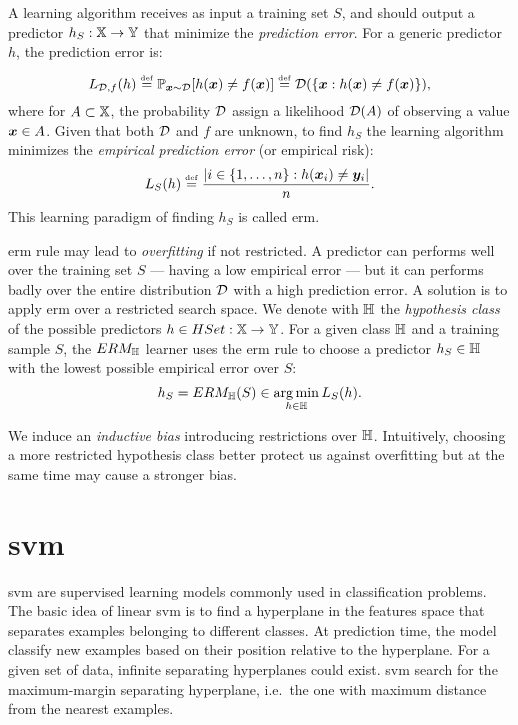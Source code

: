A learning algorithm receives as input a training set $S$, and should
output a predictor $h_S:\mathbb{X}\rightarrow\mathbb{Y}$ that minimize the
\emph{prediction error}. For a generic predictor $h$, the prediction
error is:
\begin{equation}\label{predictionError}
  L_{\mathcal{D},f}(h)\overset{\underset{\mathrm{def}}{}}{=}\mathbb{P}_{\bm{x}\sim\mathcal{D}}[h(\bm{x})\neq
  f(\bm{x})]\overset{\underset{\mathrm{def}}{}}{=}\mathcal{D}(\{\bm{x}:h(\bm{x})\neq
  f(\bm{x})\}),
\end{equation}
where for $A\subset\mathbb{X}$, the probability $\mathcal{D}$ assign a
likelihood $\mathcal{D}(A)$ of observing a value $\bm{x}\in A$. Given
that both $\mathcal{D}$ and $f$ are unknown, to find $h_S$ the learning
algorithm minimizes the \emph{empirical prediction error} (or
empirical risk):
\begin{equation}\label{empiricalError}
  L_S(h)\overset{\underset{\mathrm{def}}{}}{=}\frac{|i\in\{1,\dots,n\}:h(\bm{x}_i)\neq\bm{y}_i|}{n}.
\end{equation}
This learning paradigm of finding $h_S$ is called \ac{erm}.

\ac{erm} rule may lead to \emph{overfitting} if not restricted. A predictor
can performs well over the training set $S$ --- having a low empirical
error --- but it can performs badly over the entire distribution
$\mathcal{D}$ with a high prediction error. A solution is to apply
\ac{erm} over a restricted search space. We denote with $\mathbb{H}$ the
\emph{hypothesis class} of the possible predictors
$h\in{HSet}:\mathbb{X}\rightarrow\mathbb{Y}$. For a given class $\mathbb{H}$ and a
training sample $S$, the $ERM_{\mathbb{H}}$ learner uses the \ac{erm} rule to
choose a predictor $h_S\in\mathbb{H}$ with the lowest possible empirical
error over $S$:
\begin{equation*}
  h_S=ERM_{\mathbb{H}}(S)\in \operatorname*{arg\,min}_{h\in\mathbb{H}} L_S(h).
\end{equation*}

We induce an \emph{inductive bias} introducing restrictions over
$\mathbb{H}$. Intuitively, choosing a more restricted hypothesis class
better protect us against overfitting but at the same time may cause
a stronger bias.


\section{\acf{svm}}
\ac{svm} \cite{cortes-support-1995} are supervised learning models
commonly used in classification problems. The basic idea of linear
\ac{svm} is to find a hyperplane in the features space that separates
examples belonging to different classes. At prediction time, the model
classify new examples based on their position relative to the
hyperplane. For a given set of data, infinite separating hyperplanes
could exist. \ac{svm} search for the maximum-margin separating
hyperplane, i.e.\ the one with maximum distance from the nearest
examples.

